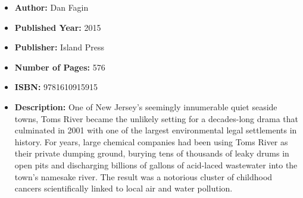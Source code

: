\documentclass{tufte-handout}
\begin{document}
\begin{itemize}
    \item[] \textbf{Author:} Dan Fagin
    \item[] \textbf{Published Year:} 2015
    \item[] \textbf{Publisher:} Island Press
    \item[] \textbf{Number of Pages:} 576 
    \item[] \textbf{ISBN:} 9781610915915
    \item[] \textbf{Description:} One of New Jersey’s seemingly innumerable quiet seaside towns, Toms River became the unlikely setting for a decades-long drama that culminated in 2001 with one of the largest environmental legal settlements in history. For years, large chemical companies had been using Toms River as their private dumping ground, burying tens of thousands of leaky drums in open pits and discharging billions of gallons of acid-laced wastewater into the town’s namesake river. The result was a notorious cluster of childhood cancers scientifically linked to local air and water pollution.
\end{itemize}
\end{document}
